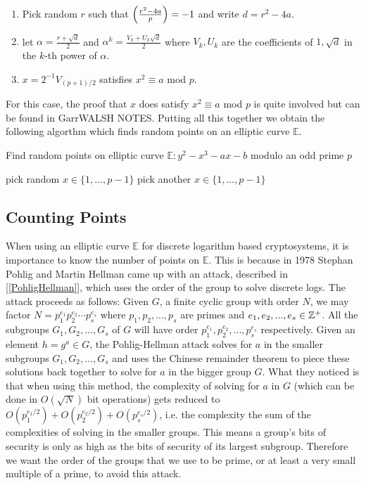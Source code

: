 \begin{enumerate}[1.]
	\item Pick random $r$ such that $\left(\frac{r^2 - 4a}{p}\right) =  -1 $ and write $d = r^2 - 4a$.
	\item let $\alpha = \frac{r+\sqrt{d}}{2}$ and $\alpha^k = \frac{V_k + U_k \sqrt{d}}{2}$ where $V_k,U_k$ are the coefficients of $1, \sqrt{d}$ in the $k$-th power of $\alpha$. 
	\item $x =  2^{-1}V_{(p+1)/2}$ satisfies $x^2 \equiv a $ mod $p$. 
\end{enumerate}

For this case, the proof that $x$ does satisfy $x^2 \equiv a $ mod $p$ is quite involved but can be found in {\color{red} GarrWALSH NOTES}. Putting all this together we obtain the following algorthm which finds random points on an elliptic curve $\mathbb{E}$. \\ 

\begin{algorithm} 
	\caption{Find random points on elliptic curve $\mathbb{E} : y^2 - x^3 - ax - b$ modulo an odd prime $p$ }
	\begin{algorithmic}[1]
			\State pick random $x \in \lbrace 1, \dots , p-1 \rbrace $
				\State pick another $x \in  \lbrace 1, \dots , p-1 \rbrace $
			\EndWhile
	  	\EndFunction
	\end{algorithmic} 
\end{algorithm} 


\subsection{Counting Points}

When using an elliptic curve $\mathbb{E}$ for discrete logarithm based cryptosystems, it is importance to know the number of points on $\mathbb{E}$. This is because in 1978 Stephan Pohlig and Martin Hellman came up with an attack, described in [\ref{PohligHellman}], which uses the order of the group to solve discrete logs. The attack proceeds as follows: Given $G$, a finite cyclic group with order $N$, we may factor $N = p_1^{e_1}p_2^{e_2} \cdots p_s^{e_s}$ where $p_1,p_2,...,p_s$ are primes and $e_1,e_2,...,e_s \in \mathbb{Z}^+ $. All the subgroups $G_1,G_2,...,G_s$ of $G$ will have order $p_1^{e_1},p_2^{e_2},...,p_s^{e_s}$ respectively. Given an element $h = g^a \in G$, the Pohlig-Hellman attack solves for $a$ in the smaller subgroups $G_1,G_2,...,G_s$ and uses the Chinese remainder theorem to piece these solutions back together to solve for $a$ in the bigger group $G$. What they noticed is that when using this method, the complexity of solving for $a$ in $G$ (which can be done in $O(\sqrt{N})$ bit operations) gets reduced to $O(p_1^{e_1/2}) + O(p_2^{e_2/2}) + O(p_s^{e_s/2})$, i.e. the complexity the sum of the complexities of solving in the smaller groups. This means a group's bits of security is only as high as the bits of security of its largest subgroup. Therefore we want the order of the groups that we use to be prime, or at least a very small multiple of a prime, to avoid this attack. \\

